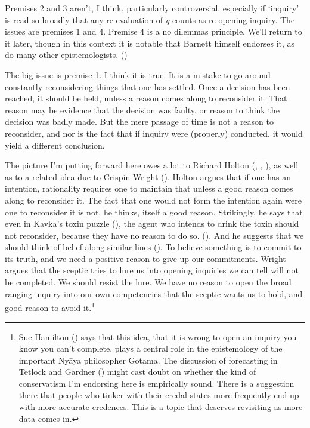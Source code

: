 \documentclass[
  11pt,
  letterpaper,
  DIV=11,
  numbers=noendperiod,
  twoside]{scrartcl}
\begin{document}
Premises 2 and 3 aren't, I think, particularly controversial, especially
if `inquiry' is read so broadly that any re-evaluation of \emph{q}
counts as re-opening inquiry. The issues are premises 1 and 4. Premise 4
is a no dilemmas principle. We'll return to it later, though in this
context it is notable that Barnett himself endorses it, as do many other
epistemologists. ()

The big issue is premise 1. I think it is true. It is a mistake to go
around constantly reconsidering things that one has settled. Once a
decision has been reached, it should be held, unless a reason comes
along to reconsider it. That reason may be evidence that the decision
was faulty, or reason to think the decision was badly made. But the mere
passage of time is not a reason to reconsider, and nor is the fact that
if inquiry were (properly) conducted, it would yield a different
conclusion.

The picture I'm putting forward here owes a lot to Richard Holton
(, ,
), as well as to a related idea due to
Crispin Wright (). Holton argues that if
one has an intention, rationality requires one to maintain that unless a
good reason comes along to reconsider it. The fact that one would not
form the intention again were one to reconsider it is not, he thinks,
itself a good reason. Strikingly, he says that even in Kavka's toxin
puzzle (), the agent who intends to
drink the toxin should not reconsider, because they have no reason to do
so. (). And he suggests
that we should think of belief along similar lines
(). To believe something is to
commit to its truth, and we need a positive reason to give up our
commitments. Wright argues that the sceptic tries to lure us into
opening inquiries we can tell will not be completed. We should resist
the lure. We have no reason to open the broad ranging inquiry into our
own competencies that the sceptic wants us to hold, and good reason to
avoid it.\footnote{Sue Hamilton ()
  says that this idea, that it is wrong to open an inquiry you know you
  can't complete, plays a central role in the epistemology of the
  important Nyāya philosopher Gotama. The discussion of forecasting in
  Tetlock and Gardner () might cast
  doubt on whether the kind of conservatism I'm endorsing here is
  empirically sound. There is a suggestion there that people who tinker
  with their credal states more frequently end up with more accurate
  credences. This is a topic that deserves revisiting as more data comes
  in.}
\end{document}
